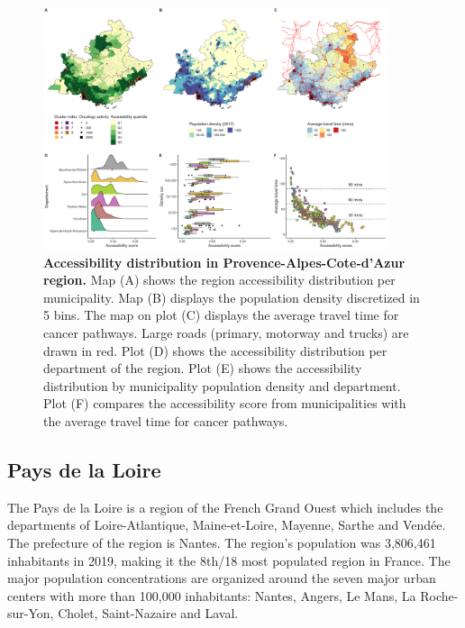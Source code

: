 \begin{figure}[H]
    \includegraphics[width=0.9\textwidth]{images/camion/fig4_accessibility_Provence-Alpes-Cote-d'Azur.png}
    \centering
    \caption{ \textbf{Accessibility distribution in Provence-Alpes-Cote-d'Azur
            region.} Map (A) shows the region accessibility distribution per
        municipality. Map (B) displays the population density discretized in 5
        bins. The map on plot (C) displays the average travel time for cancer
        pathways. Large roads (primary, motorway and trucks) are drawn in red.
        Plot (D) shows the accessibility distribution per department of the
        region. Plot (E) shows the accessibility distribution by municipality
        population density and department. Plot (F) compares the accessibility
        score from municipalities with the average travel time for cancer
        pathways. }
    \label{fig:accessibility-paca}
\end{figure}

\subsection*{Pays de la Loire}

The Pays de la Loire is a region of the French Grand Ouest which includes the
departments of Loire-Atlantique, Maine-et-Loire, Mayenne, Sarthe and Vendée. The
prefecture of the region is Nantes. The region's population was 3,806,461
inhabitants in 2019, making it the 8th/18 most populated region in France. The
major population concentrations are organized around the seven major urban
centers with more than 100,000 inhabitants: Nantes, Angers, Le Mans, La
Roche-sur-Yon, Cholet, Saint-Nazaire and Laval.

